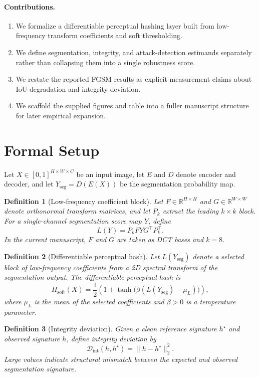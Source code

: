 \documentclass[11pt]{article}
\newtheorem{definition}{Definition}
\begin{document}
\paragraph{Contributions.}
\begin{enumerate}[leftmargin=*]
\item We formalize a differentiable perceptual hashing layer built from low-frequency transform coefficients and soft thresholding.
\item We define segmentation, integrity, and attack-detection estimands separately rather than collapsing them into a single robustness score.
\item We restate the reported FGSM results as explicit measurement claims about IoU degradation and integrity deviation.
\item We scaffold the supplied figures and table into a fuller manuscript structure for later empirical expansion.
\end{enumerate}

\section{Formal Setup}
Let $X\in[0,1]^{H\times W\times C}$ be an input image, let $E$ and $D$ denote encoder and decoder, and let $Y_{\mathrm{seg}}=D(E(X))$ be the segmentation probability map.

\begin{definition}[Low-frequency coefficient block]
Let $F\in\mathbb{R}^{H\times H}$ and $G\in\mathbb{R}^{W\times W}$ denote orthonormal transform matrices, and let $P_k$ extract the leading $k\times k$ block. For a single-channel segmentation score map $Y$, define
\[
L(Y)=P_k FYG^\top P_k^\top.
\]
In the current manuscript, $F$ and $G$ are taken as DCT bases and $k=8$.
\end{definition}

\begin{definition}[Differentiable perceptual hash]
Let $L(Y_{\mathrm{seg}})$ denote a selected block of low-frequency coefficients from a 2D spectral transform of the segmentation output. The differentiable perceptual hash is
\[
H_{\mathrm{soft}}(X)=\frac{1}{2}\left(1+\tanh\bigl(\beta(L(Y_{\mathrm{seg}})-\mu_L)\bigr)\right),
\]
where $\mu_L$ is the mean of the selected coefficients and $\beta>0$ is a temperature parameter.
\end{definition}

\begin{definition}[Integrity deviation]
Given a clean reference signature $h^\star$ and observed signature $h$, define integrity deviation by
\[
\mathcal{D}_{\mathrm{int}}(h,h^\star)=\|h-h^\star\|_2^2.
\]
Large values indicate structural mismatch between the expected and observed segmentation signature.
\end{definition}
\end{document}
